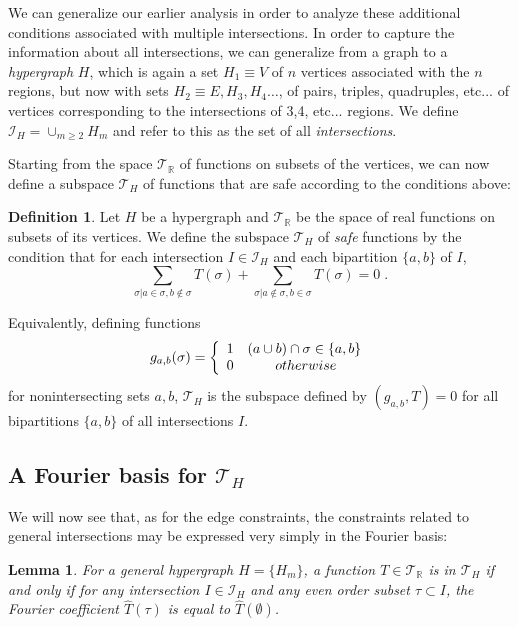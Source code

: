 \documentclass[10pt,a4paper]{amsart}
\newcommand{\cal}{\mathcal}
\newtheorem{lemma}[theorem]{Lemma}
\theoremstyle{definition}
\newtheorem{definition}[theorem]{Definition}
\begin{document}
We can generalize our earlier analysis in order to analyze these additional conditions associated with multiple intersections. In order to capture the information about all intersections, we can generalize from a graph to a {\it hypergraph} $H$, which is again a set $H_1 \equiv V$ of $n$ vertices associated with the $n$ regions, but now with sets $H_2 \equiv E, H_3, H_4 \dots$, of pairs, triples, quadruples, etc... of vertices corresponding to the intersections of 3,4, etc... regions. We define ${\cal I}_H = \cup_{m \ge 2} H_m$ and refer to this as the set of all {\it intersections}.

Starting from the space ${\cal T}_\mathbb{R}$ of functions on subsets of the vertices, we can now define a subspace ${\cal T}_H$ of functions that are safe according to the conditions above:
\begin{definition}
    Let $H$ be a hypergraph and ${\cal T}_{\mathbb{R}}$ be the space of real functions on subsets of its vertices. We define the subspace ${\cal T}_H$ of {\it safe} functions by the condition that for each intersection $I \in {\cal I}_H$ and each bipartition $\{a,b\}$ of $I$, 
\begin{equation}
\label{gencond}
\sum_{\sigma | a \in \sigma, b \notin \sigma} T(\sigma) + \sum_{\sigma | a \notin \sigma, b \in \sigma} T(\sigma) = 0 \; .
\end{equation}
\end{definition}
Equivalently, defining functions
\[
g_{a,b}(\sigma) = \left\{ \begin{array}{ll} 1 & (a \cup b) \cap \sigma \in \{a,b\} \cr
0 & \qquad {\rm otherwise} \end{array}  \right.
\]
for nonintersecting sets $a,b$, ${\cal T}_H$ is the subspace defined by $(g_{a,b}, T) = 0$ for all bipartitions $\{a,b\}$ of all intersections $I$. 

\subsection{A Fourier basis for ${\cal T}_H$}

We will now see that, as for the edge constraints, the constraints related to general intersections may be expressed very simply in the Fourier basis:


\begin{lemma}
\label{FourLemma}
For a general hypergraph $H = \{H_m\}$, a function $T \in {\cal T}_\mathbb{R}$ is in ${\cal T}_H$ if and only if for any intersection $I \in {\cal I}_H$ and any even order subset $\tau \subset I$, the Fourier coefficient $\hat{T}(\tau)$ is equal to $\hat{T}(\emptyset)$. 
\end{lemma}
\end{document}
